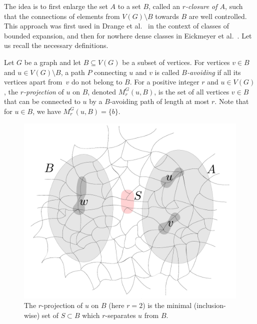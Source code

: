 The idea is to first enlarge the set $A$ to a set $B$, called
an \emph{$r$-closure of $A$}, such 
that the connections of elements from $V(G)\setminus B$ 
towards $B$ are well controlled. This approach
was first used in Drange et al.~\cite{drange2016kernelization} in the context of classes of bounded expansion, 
and then for nowhere dense classes in Eickmeyer et al.~\cite{eickmeyer2016neighborhood}. 
Let us recall the necessary definitions.

Let $G$ be a graph and let $B\subseteq V(G)$ be a subset of vertices. For vertices $v\in B$ and $u\in V(G)\setminus B$, a path $P$ connecting $u$ and $v$ is called {\em{$B$-avoiding}}
if all its vertices apart from~$v$ do not belong to $B$. For a positive integer $r$ and $u\in V(G)$, the {\em{$r$-projection}} of $u$ on $B$, denoted $M^G_r(u,B)$, is the set of all vertices $v\in B$ that
can be connected to $u$ by a $B$-avoiding path of length at most $r$. Note that for $u\in B$, we have $M^G_r(u,B)=\{b\}$.
%
%
\begin{figure}[h!]
	\centering
		\includegraphics[scale=0.35,page=2]{pics}
	\caption{The  $r$-projection of $u$ on $B$
	(here $r=2$)
	is the minimal (inclusion-wise) set of $S\subset B$
	which $r$-separates $ u$ from $B$.
	}
	\label{fig:gaifman}
\end{figure}

